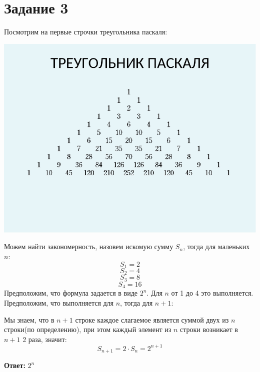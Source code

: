 \documentclass[a4paper,12pt]{article}
\author{Бурмашев Григорий, БПМИ-208}
\title{}
\date{\today}
\begin{document}
\section*{Задание 3}
Посмотрим на первые строчки треугольника паскаля:

\begin{center}
\includegraphics[scale=0.2]{img8.jpg}
\end{center}
Можем найти закономерность, назовем искомую сумму $S_n$, тогда для маленьких $n$:
\[
S_1 = 2
\]
\[
S_2 = 4
\]
\[
S_3 = 8
\]
\[
S_4 = 16
\]
Предположим, что формула задается в виде $2^n$. Для $n$ от 1 до 4 это выполняется. Предположим, что выполняется для $n$, тогда для $n + 1$:

Мы знаем, что в $n + 1$ строке каждое слагаемое является суммой двух из $n$ строки(по определению), при этом каждый элемент из $n$ строки возникает в $n + 1$ 2 раза, значит:
\[
S_{n + 1} = 2 \cdot S_n = 2^{n + 1}
\]
\begin{center}
\textbf{Ответ: } $2^n$
\end{center}
\end{document}
